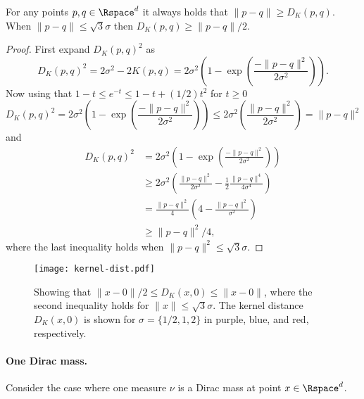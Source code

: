 \documentclass[11pt]{myclass}
\begin{document}
\begin{lemma}
\label{lem:E2DK}
For any points $p,q \in \Rspace^d$ it always holds that $\|p-q\| \geq D_K(p,q)$.  
When $\|p-q\| \leq \sqrt{3} \sigma$ then $D_K(p,q) \geq \|p-q\|/2$.  
\end{lemma}
\begin{proof}
First expand $D_K(p,q)^2$ as
\[
D_K(p,q)^2 
= 
2 \sigma^2 - 2 K(p,q)
= 
2 \sigma^2 \left(1 - \exp\left(\frac{-\|p-q\|^2}{2\sigma^2}\right)\right).
\]
Now using that $1 - t \leq e^{-t}  \leq 1 - t + (1/2) t^2$ for $t\geq0$
\[
D_K(p,q)^2 = 2 \sigma^2 \left(1 - \exp\left(\frac{-\|p-q\|^2}{2\sigma^2}\right)\right)
\leq
2 \sigma^2 \left(\frac{\|p-q\|^2}{2\sigma^2}\right)
= 
\|p-q\|^2
\]
and 
\begin{align*}
D_K(p,q)^2 &= 2 \sigma^2 \left(1 - \exp\left(\frac{-\|p-q\|^2}{2\sigma^2}\right)\right)
\\ &\geq
2 \sigma^2 \left(\frac{\|p-q\|^2}{2\sigma^2} - \frac{1}{2} \frac{\|p-q\|^4}{4 \sigma^4}\right)
\\ &=
\frac{\|p-q\|^2}{4} \left(4 - \frac{\|p-q\|^2}{\sigma^2}\right)
\\ &\geq
\|p-q\|^2/4,
\end{align*}
where the last inequality holds when $\|p-q\|^2 \leq  \sqrt{3}\sigma$.  
\end{proof}

\begin{figure}
\begin{center}\texttt{[image: kernel-dist.pdf]}\end{center}
\caption{\label{fig:Euc-bound}
\small \sffamily
Showing that $\|x-0\|/2 \leq D_K(x,0) \leq \|x-0\|$, where the second inequality holds for $\|x\| \leq \sqrt{3} \sigma$.  The kernel distance $D_K(x,0)$ is shown for $\sigma = \{1/2, 1, 2\}$ in purple, blue, and red, respectively.  
}
\end{figure}



\paragraph{One Dirac mass.}
Consider the case where one measure $\nu$ is a Dirac mass at point $x \in \Rspace^d$.    
\end{document}
